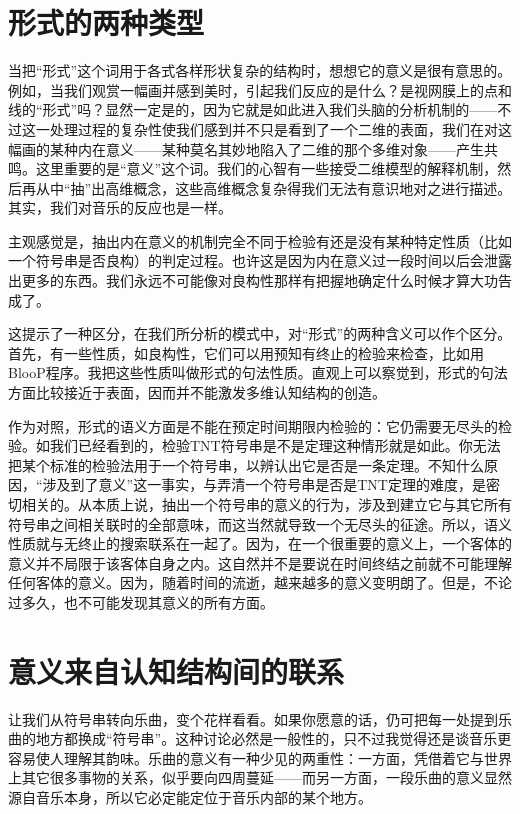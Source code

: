 \section{形式的两种类型}

当把“形式”这个词用于各式各样形状复杂的结构时，想想它的意义是很有意思的。例如，当我们观赏一幅画并感到美时，引起我们反应的是什么？是视网膜上的点和线的“形式”吗？显然一定是的，因为它就是如此进入我们头脑的分析机制的——不过这一处理过程的复杂性使我们感到并不只是看到了一个二维的表面，我们在对这幅画的某种内在意义——某种莫名其妙地陷入了二维的那个多维对象——产生共鸣。这里重要的是“意义”这个词。我们的心智有一些接受二维模型的解释机制，然后再从中“抽”出高维概念，这些高维概念复杂得我们无法有意识地对之进行描述。其实，我们对音乐的反应也是一样。

主观感觉是，抽出内在意义的机制完全不同于检验有还是没有某种特定性质（比如一个符号串是否良构）的判定过程。也许这是因为内在意义过一段时间以后会泄露出更多的东西。我们永远不可能像对良构性那样有把握地确定什么时候才算大功告成了。

这提示了一种区分，在我们所分析的模式中，对“形式”的两种含义可以作个区分。首先，有一些性质，如良构性，它们可以用预知有终止的检验来检查，比如用BlooP程序。我把这些性质叫做形式的句法性质。直观上可以察觉到，形式的句法方面比较接近于表面，因而并不能激发多维认知结构的创造。

作为对照，形式的语义方面是不能在预定时间期限内检验的：它仍需要无尽头的检验。如我们已经看到的，检验TNT符号串是不是定理这种情形就是如此。你无法把某个标准的检验法用于一个符号串，以辨认出它是否是一条定理。不知什么原因，“涉及到了意义”这一事实，与弄清一个符号串是否是TNT定理的难度，是密切相关的。从本质上说，抽出一个符号串的意义的行为，涉及到建立它与其它所有符号串之间相关联时的全部意味，而这当然就导致一个无尽头的征途。所以，语义性质就与无终止的搜索联系在一起了。因为，在一个很重要的意义上，一个客体的意义并不局限于该客体自身之内。这自然并不是要说在时间终结之前就不可能理解任何客体的意义。因为，随着时间的流逝，越来越多的意义变明朗了。但是，不论过多久，也不可能发现其意义的所有方面。

\section{意义来自认知结构间的联系}

让我们从符号串转向乐曲，变个花样看看。如果你愿意的话，仍可把每一处提到乐曲的地方都换成“符号串”。这种讨论必然是一般性的，只不过我觉得还是谈音乐更容易使人理解其韵味。乐曲的意义有一种少见的两重性：一方面，凭借着它与世界上其它很多事物的关系，似乎要向四周蔓延——而另一方面，一段乐曲的意义显然源自音乐本身，所以它必定能定位于音乐内部的某个地方。

